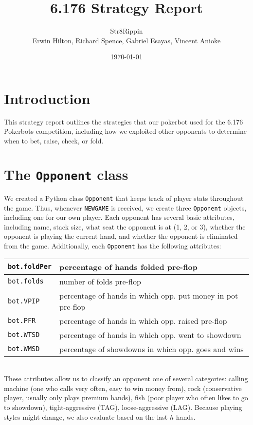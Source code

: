 \documentclass{article}
\title{6.176 Strategy Report}
\author{Str8Rippin \\
Erwin Hilton, Richard Spence, Gabriel Esayas, Vincent Anioke}
\date{\today}
\begin{document}
\maketitle

\section*{Introduction}
This strategy report outlines the strategies that our pokerbot used for the 6.176 Pokerbots competition, including how we exploited other opponents to determine when to bet, raise, check, or fold.

\section*{The \texttt{Opponent} class}
We created a Python class \texttt{Opponent} that keeps track of player stats throughout the game. Thus, whenever \texttt{NEWGAME} is received, we create three \texttt{Opponent} objects, including one for our own player. Each opponent has several basic attributes, including name, stack size, what seat the opponent is at (1, 2, or 3), whether the opponent is playing the current hand, and whether the opponent is eliminated from the game. Additionally, each \texttt{Opponent} has the following attributes: \\

\begin{tabular}{|l|l|}  \hline
\texttt{bot.foldPer} & percentage of hands folded pre-flop \\ \hline
\texttt{bot.folds} & number of folds pre-flop \\ \hline
\texttt{bot.VPIP} & percentage of hands in which opp. put money in pot pre-flop  \\ \hline
\texttt{bot.PFR} & percentage of hands in which opp. raised pre-flop \\ \hline
\texttt{bot.WTSD} & percentage of hands in which opp. went to showdown \\ \hline
\texttt{bot.WMSD} & percentage of showdowns in which opp. goes and wins \\ \hline

\end{tabular} \\

These attributes allow us to classify an opponent one of several categories: calling machine (one who calls very often, easy to win money from), rock (conservative player, usually only plays premium hands), fish (poor player who often likes to go to showdown), tight-aggressive (TAG), loose-aggressive (LAG). Because playing styles might change, we also evaluate based on the last $h$ hands. 
\end{document}
